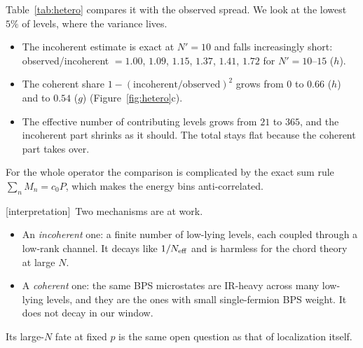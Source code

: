 \documentclass[11pt]{article}
\newcommand{\Np}{N'}
\newcommand{\tagbox}[2]{\textsf{\small\color{#1}[#2]}}
\newcommand{\INTERP}{\tagbox{cconj}{interpretation}}
\theoremstyle{plain}
\theoremstyle{remark}
\numberwithin{equation}{section}
\begin{document}
Table~\ref{tab:hetero} compares it with the observed spread. We look at the lowest $5\%$ of levels, where the variance
lives.
\begin{itemize}\itemsep1pt
\item The incoherent estimate is exact at $\Np=10$ and falls increasingly short: observed/incoherent $=1.00$, $1.09$,
  $1.15$, $1.37$, $1.41$, $1.72$ for $\Np=10$--$15$ ($h$).
\item The coherent share $1-(\text{incoherent}/\text{observed})^2$ grows from $0$ to $0.66$ ($h$) and to $0.54$ ($g$)
  (Figure~\ref{fig:hetero}c).
\item The effective number of contributing levels grows from $21$ to $365$, and the incoherent part shrinks as it
  should. The total stays flat because the coherent part takes over.
\end{itemize}
For the whole operator the comparison is complicated by the exact sum rule $\sum_nM_n=c_0P$, which makes the energy bins
anti-correlated.

\INTERP\ Two mechanisms are at work.
\begin{itemize}\itemsep1pt
\item An \emph{incoherent} one: a finite number of low-lying levels, each coupled through a low-rank channel. It decays
  like $1/N_{\rm eff}$ and is harmless for the chord theory at large $N$.
\item A \emph{coherent} one: the same BPS microstates are IR-heavy across many low-lying levels, and they are the ones
  with small single-fermion BPS weight. It does not decay in our window.
\end{itemize}
Its large-$N$ fate at fixed $p$ is the same open question as that of localization itself.
\end{document}
